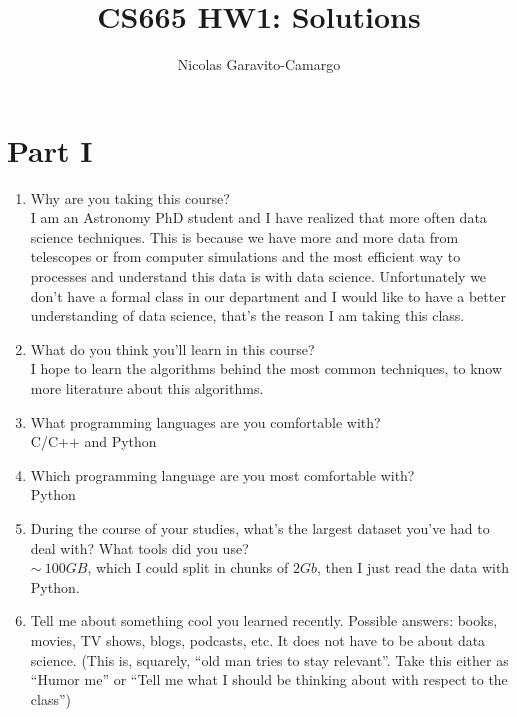\documentclass[14pt]{article}
\title{CS665 HW1: Solutions}
\author{Nicolas Garavito-Camargo}
\begin{document}
\maketitle

\section{Part I}

\begin{enumerate}
\item  Why are you taking this course?\\

I am an Astronomy PhD student and I have realized that more often data
science techniques. This is because we have more and more data from
telescopes or from computer simulations and the most efficient way to 
processes and understand this data is with data science. Unfortunately
we don't have a formal class in our department and I would like to
have a better understanding of data science, that's the reason I am
taking this class.

\item  What do you think you’ll learn in this course?\\

I hope to learn the algorithms behind the most common techniques,
to know more literature about this algorithms. 

\item  What programming languages are you comfortable with?\\

C/C++ and Python

\item  Which programming language are you most comfortable with? \\

Python

\item During the course of your studies, what’s the largest dataset
you’ve had to deal with? What tools did you use?\\

$\sim ~ 100 GB$, which I could split in chunks of $2 Gb$, then I just
read the data with Python.


\item  Tell me about something cool you learned recently. Possible
answers: books, movies, TV shows, blogs, podcasts, etc. It does not
have to be about data science. (This is, squarely, “old man tries to
stay relevant”. Take this either as “Humor me” or “Tell me what I
should be thinking about with respect to the class”)\\


\end{enumerate}
\end{document}
